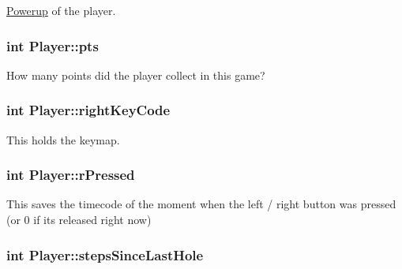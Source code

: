 \hyperlink{classPowerup}{Powerup} of the player. 

\hypertarget{classPlayer_a3b5be83653107f1c320463a6645b5716}{}
\subsubsection[{pts}]{\setlength{\rightskip}{0pt plus 5cm}int Player\+::pts\hspace{0.3cm}{\ttfamily [private]}}\label{classPlayer_a3b5be83653107f1c320463a6645b5716}


How many points did the player collect in this game? 

\hypertarget{classPlayer_a6caf1b82bbc044e0e14ed81f929142ae}{}
\subsubsection[{right\+Key\+Code}]{\setlength{\rightskip}{0pt plus 5cm}int Player\+::right\+Key\+Code\hspace{0.3cm}{\ttfamily [private]}}\label{classPlayer_a6caf1b82bbc044e0e14ed81f929142ae}


This holds the keymap. 

\hypertarget{classPlayer_a025ccf2fab2797437686a9d4b88147b7}{}
\subsubsection[{r\+Pressed}]{\setlength{\rightskip}{0pt plus 5cm}int Player\+::r\+Pressed\hspace{0.3cm}{\ttfamily [private]}}\label{classPlayer_a025ccf2fab2797437686a9d4b88147b7}


This saves the timecode of the moment when the left / right button was pressed (or 0 if it\textquotesingle{}s released right now) 

\hypertarget{classPlayer_ab2eab1f5836b101d675d7e8fe885308d}{}
\subsubsection[{steps\+Since\+Last\+Hole}]{\setlength{\rightskip}{0pt plus 5cm}int Player\+::steps\+Since\+Last\+Hole\hspace{0.3cm}{\ttfamily [private]}}\label{classPlayer_ab2eab1f5836b101d675d7e8fe885308d}



